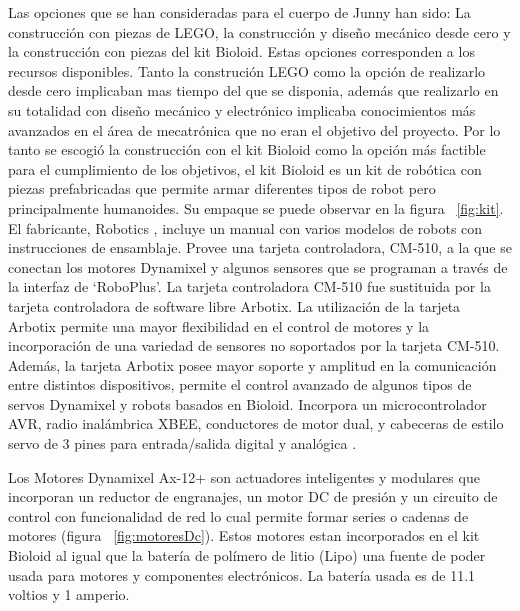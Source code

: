 Las opciones que se han consideradas para el cuerpo de Junny han sido: La construcci\'on con piezas de LEGO, la construcci\'on y dise\~no mec\'anico desde cero y la construcci\'on con piezas del kit Bioloid. Estas opciones corresponden a los recursos disponibles. Tanto la construci\'on LEGO como la opci\'on de realizarlo desde cero implicaban mas tiempo del que se disponia, adem\'as que realizarlo en su totalidad con dise\~no mec\'anico y electr\'onico implicaba conocimientos m\'as avanzados en el \'area de mecatr\'onica que no eran el objetivo del proyecto. Por lo tanto se escogi\'o la construcci\'on con el kit Bioloid como la opci\'on m\'as factible para el cumplimiento de los objetivos, el kit Bioloid es un kit de robótica con piezas prefabricadas que permite armar diferentes tipos de robot pero principalmente humanoides. Su empaque se puede observar en la figura ~\ref{fig:kit}. El fabricante, Robotics \cite{robotics}, incluye un manual con varios modelos de robots con instrucciones de ensamblaje. Provee una tarjeta controladora, CM-510, a la que se conectan los motores Dynamixel y algunos sensores que se programan a través de la interfaz de ‘RoboPlus’\cite{robotics}. La tarjeta controladora CM-510 fue sustituida por la tarjeta controladora de software libre Arbotix. La utilización de la tarjeta Arbotix permite una mayor flexibilidad en el control de motores y la incorporación de una variedad de sensores no soportados por la tarjeta CM-510.
Además, la tarjeta Arbotix posee mayor soporte y amplitud en la comunicación entre distintos dispositivos, permite el control avanzado de algunos tipos de servos Dynamixel y robots basados en Bioloid. Incorpora un microcontrolador \gls{AVR}, radio inalámbrica \gls{XBEE}, conductores de motor dual, y cabeceras de estilo servo de 3 pines para entrada/salida digital y analógica \cite{arbotix}.

Los Motores Dynamixel Ax-12+ son actuadores inteligentes y modulares que incorporan un reductor de engranajes, un motor DC de presión y un circuito de control con funcionalidad de red lo cual permite formar series o cadenas de motores (figura ~\ref{fig:motoresDc}). Estos motores estan incorporados en el kit Bioloid al igual que la batería de polímero de litio (Lipo) una fuente de poder usada para motores y componentes electr\'onicos. La batería usada es de 11.1 voltios y 1 amperio. \cite{bateria}





